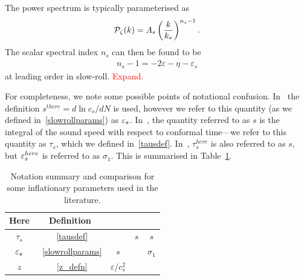 The power spectrum is typically parameterised as
\begin{align}
    \mathcal{P}_{\mathcal{\zeta}}(k) = A_s \left(\frac{k}{k_*}\right)^{n_s-1}.
\end{align}
The scalar spectral index $n_s$ can then be found to be
\begin{align}
n_s-1 = -2\varepsilon-\eta-\varepsilon_s
\end{align}
at leading order in slow-roll.
    \textcolor{red}{Expand.}


    For completeness, we note some possible points of notational confusion.
    In~\cite{px_burrage} the definition $s^{there}=d\ln c_s/dN$ is used, however we refer to this
    quantity (as we defined in~\eqref{slowrollparams}) as $\varepsilon_{s}$.
    In~\cite{Hu_2011}, the quantity referred to as $s$ is the integral of the sound speed
    with respect to conformal time---we refer to this quantity as $\tau_s$,
    which we defined in~\eqref{tausdef}.
    In~\cite{warp_features_dbi}, $\tau_s^{here}$ is also referred to as $s$,
    but $\varepsilon_{s}^{here}$ is referred to as $\sigma_1$.
    This is summarised in Table~\ref{tab:notation}.


\begin{table}[h!]
  \begin{center}
    \begin{tabular}{ccccc}
        \toprule
        Here & Definition &~\cite{px_burrage}&~\cite{Hu_2011} &~\cite{warp_features_dbi}\\
        \midrule
        $\tau_s$ &~\eqref{tausdef} & ~ & $s$ & $s$ \\
        $\varepsilon_{s}$ &~\eqref{slowrollparams} & $s$ & ~ & $\sigma_1$ \\
        $z$ &~\eqref{z_defn} & $\varepsilon/c_s^2$ & ~ & ~ \\
        \bottomrule
    \end{tabular}
    \caption{
        Notation summary and comparison for some inflationary parameters
        used in the literature.
    }\label{tab:notation}
  \end{center}
\end{table}


